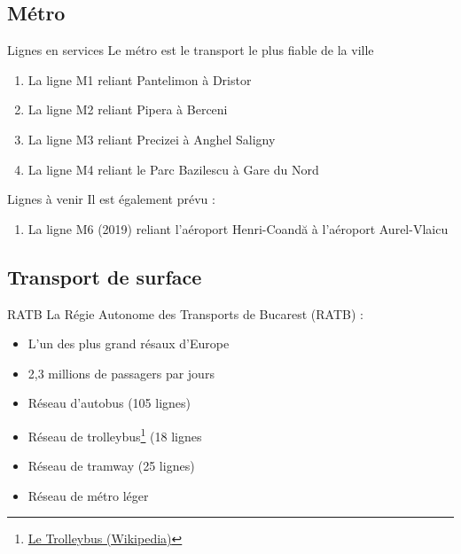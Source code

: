 \documentclass{beamer}
\begin{document}
	\subsection{Métro}
	\begin{frame}{Lignes en services}
		Le métro est le transport le plus fiable de la ville
		\begin{enumerate}
			\item{La ligne M1 reliant Pantelimon à Dristor}
			\item{La ligne M2 reliant Pipera à Berceni}
			\item{La ligne M3 reliant Precizei à Anghel Saligny}
			\item{La ligne M4 reliant le Parc Bazilescu à Gare du Nord}
		\end{enumerate}
	\end{frame}
	\begin{frame}{Lignes à venir}
		Il est également prévu : 
		\begin{enumerate}
			\item{La ligne M6 (2019) reliant l'aéroport Henri-Coand\u{a} à l'aéroport Aurel-Vlaicu}
		\end{enumerate}	
	\end{frame}

	\subsection{Transport de surface}
	\begin{frame}{RATB}
		La Régie Autonome des Transports de Bucarest (RATB) :
		\begin{itemize}
			\item{L'un des plus grand résaux d'Europe}
			\item{2,3 millions de passagers par jours}
			\item{Réseau d'autobus (105 lignes)}
			\item{Réseau de trolleybus\footnote{\href{https://fr.wikipedia.org/wiki/Trolleybus}{Le Trolleybus (Wikipedia)}} (18 lignes}
			\item{Réseau de tramway (25 lignes)}
			\item{Réseau de métro léger}
		\end{itemize}
	\end{frame}
\end{document}
